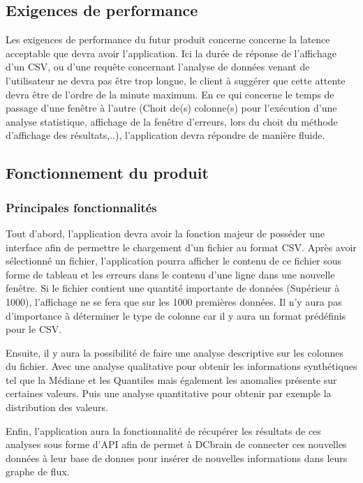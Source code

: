 		\subsection{Exigences de performance} 

		Les exigences de performance du futur produit concerne concerne la latence acceptable que devra avoir l'application. Ici la durée de réponse de l’affichage d’un CSV, ou d’une requête concernant l’analyse de données venant de l’utilisateur ne devra pas être trop longue, le client à suggérer que cette attente devra être de l’ordre de la minute maximum. En ce qui concerne le temps de passage d'une fenêtre à l'autre (Choit de(s) colonne(s) pour l'exécution d'une analyse statistique, affichage de la fenêtre d'erreurs, lors du choit du méthode d’affichage des résultats,..), l’application devra répondre de manière fluide. 

		\subsection{Fonctionnement du produit}
			\subsubsection{Principales fonctionnalités}
			Tout d’abord, l’application devra avoir la fonction majeur de posséder une interface afin de permettre le chargement d’un fichier au format CSV. Après avoir sélectionné un fichier, l’application pourra afficher le contenu de ce fichier sous forme de tableau et les erreurs dans le contenu d'une ligne dans une nouvelle fenêtre. Si le fichier contient une quantité importante de données (Supérieur à 1000), l’affichage ne se fera que sur les 1000 premières données.
			Il n’y aura pas d’importance à déterminer le type de colonne car il y aura un format prédéfinis pour le CSV.\newline

			Ensuite, il y aura la possibilité de faire une analyse descriptive sur les colonnes du fichier. Avec une analyse qualitative pour obtenir les informations synthétiques tel que la Médiane et les Quantiles mais également les anomalies présente sur certaines valeurs. Puis une analyse quantitative pour obtenir par exemple la distribution des valeurs.\newline

			Enfin, l’application aura la fonctionnalité de récupérer les résultats de ces analyses sous forme d’API afin de permet à DCbrain de connecter ces nouvelles données à leur base de donnes pour insérer de nouvelles informations dans leurs graphe de flux.

